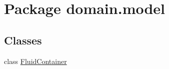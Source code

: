 \hypertarget{namespacedomain_1_1model}{}\section{Package domain.\+model}
\label{namespacedomain_1_1model}
\subsection*{Classes}
\begin{DoxyCompactItemize}
\item 
class \mbox{\hyperlink{classdomain_1_1model_1_1FluidContainer}{Fluid\+Container}}
\end{DoxyCompactItemize}
